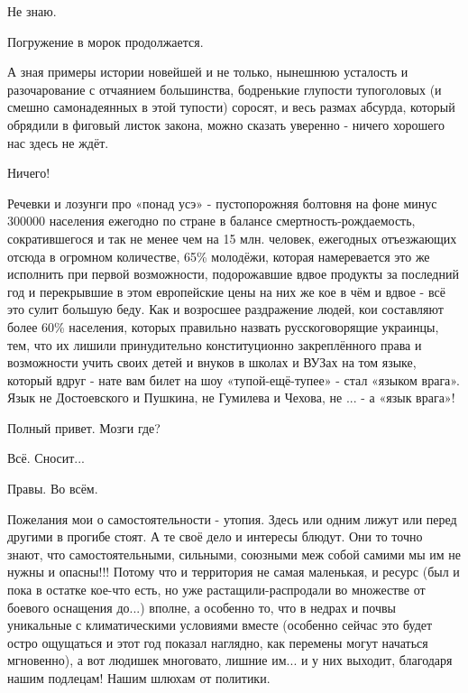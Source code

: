 \begin{itemize}
Не знаю.

Погружение в морок продолжается.

А зная примеры истории новейшей и не только, нынешнюю усталость и разочарование
с отчаянием большинства, бодренькие глупости тупоголовых (и смешно
самонадеянных в этой тупости) соросят, и весь размах абсурда, который обрядили
в фиговый листок закона, можно сказать уверенно - ничего хорошего нас здесь не
ждёт.

Ничего!

Речевки и лозунги про «понад усэ» - пустопорожняя болтовня на фоне минус 300000
населения ежегодно по стране в балансе смертность-рождаемость, сократившегося и
так не менее чем на 15 млн. человек, ежегодных отъезжающих отсюда в огромном
количестве, 65\% молодёжи, которая намеревается это же исполнить при первой
возможности, подорожавшие вдвое продукты за последний год и перекрывшие в этом
европейские цены на них же кое в чём и вдвое - всё это сулит большую беду. Как
и возросшее раздражение людей, кои составляют более 60\% населения, которых
правильно назвать русскоговорящие украинцы, тем, что их лишили принудительно
конституционно закреплённого права и возможности учить своих детей и внуков в
школах и ВУЗах на том языке, который вдруг - нате вам билет на шоу
«тупой-ещё-тупее» - стал «языком врага». Язык не Достоевского и Пушкина, не
Гумилева и Чехова, не ... - а «язык врага»!

Полный привет. Мозги где?

Всё. Сносит...

Правы. Во всём.

Пожелания мои о самостоятельности - утопия. Здесь или одним лижут или перед
другими в прогибе стоят. А те своё дело и интересы блюдут. Они то точно знают,
что самостоятельными, сильными, союзными меж собой самими мы им не нужны и
опасны!!! Потому что и территория не самая маленькая, и ресурс (был и пока в
остатке кое-что есть, но уже растащили-распродали во множестве от боевого
оснащения до...) вполне, а особенно то, что в недрах и почвы уникальные с
климатическими условиями вместе (особенно сейчас это будет остро ощущаться и
этот год показал наглядно, как перемены могут начаться мгновенно), а вот
людишек многовато, лишние им... и у них выходит, благодаря нашим подлецам! Нашим
шлюхам от политики.



\end{itemize}

